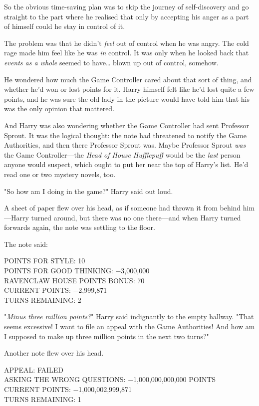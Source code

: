So the obvious time-saving plan was to skip the journey of self-discovery and 
go straight to the part where he realised that only by accepting his anger as a 
part of himself could he stay in control of it.

The problem was that he didn't \emph{feel} out of control when he was angry. 
The cold rage made him feel like he was \emph{in} control. It was only when he 
looked back that \emph{events as a whole} seemed to have{\ldots} blown up out 
of control, somehow.

He wondered how much the Game Controller cared about that sort of thing, and 
whether he'd won or lost points for it. Harry himself felt like he'd lost quite 
a few points, and he was sure the old lady in the picture would have told him 
that his was the only opinion that mattered.

And Harry was also wondering whether the Game Controller had sent Professor 
Sprout. It was the logical thought: the note had threatened to notify the Game 
Authorities, and then there Professor Sprout was. Maybe Professor Sprout 
\emph{was} the Game Controller---the\emph{ Head of House Hufflepuff} would be 
the \emph{last} person anyone would suspect, which ought to put her near the 
top of Harry's list. He'd read one or two mystery novels, too.

"So how am I doing in the game?" Harry said out loud.

A sheet of paper flew over his head, as if someone had thrown it from behind 
him---Harry turned around, but there was no one there---and when Harry turned 
forwards again, the note was settling to the floor.

The note said:

POINTS FOR STYLE: 10\\
POINTS FOR GOOD THINKING: $-$3,000,000\\
RAVENCLAW HOUSE POINTS BONUS: 70\\
CURRENT POINTS: $-$2,999,871\\
TURNS REMAINING: 2

"\emph{Minus three million points?}" Harry said indignantly to the empty 
hallway. "That seems excessive! I want to file an appeal with the Game 
Authorities! And how am I supposed to make up three million points in the next 
two turns?"

Another note flew over his head.

APPEAL: FAILED\\
ASKING THE WRONG QUESTIONS: $-$1,000,000,000,000 POINTS\\
CURRENT POINTS: $-$1,000,002,999,871\\
TURNS REMAINING: 1

